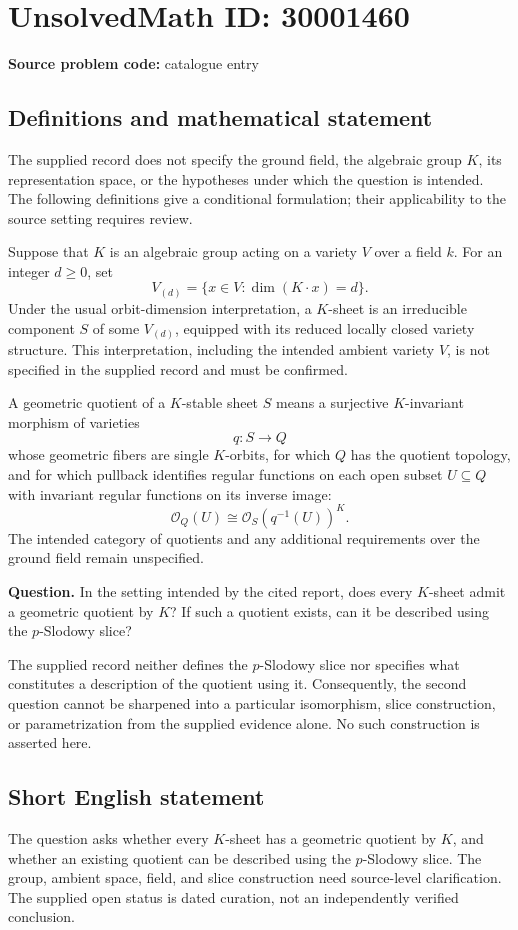 \documentclass[11pt]{article}
\begin{document}
\section*{UnsolvedMath ID: 30001460}
\textbf{Source problem code:} catalogue entry
\subsection{Definitions and mathematical statement}
The supplied record does not specify the ground field, the algebraic group \(K\), its representation space, or the hypotheses under which the question is intended. The following definitions give a conditional formulation; their applicability to the source setting requires review.

Suppose that \(K\) is an algebraic group acting on a variety \(V\) over a field \(k\). For an integer \(d\geq 0\), set
\[
V_{(d)}=\{x\in V:\dim(K\cdot x)=d\}.
\]
Under the usual orbit-dimension interpretation, a \(K\)-sheet is an irreducible component \(S\) of some \(V_{(d)}\), equipped with its reduced locally closed variety structure. This interpretation, including the intended ambient variety \(V\), is not specified in the supplied record and must be confirmed.

A geometric quotient of a \(K\)-stable sheet \(S\) means a surjective \(K\)-invariant morphism of varieties
\[
q:S\longrightarrow Q
\]
whose geometric fibers are single \(K\)-orbits, for which \(Q\) has the quotient topology, and for which pullback identifies regular functions on each open subset \(U\subseteq Q\) with invariant regular functions on its inverse image:
\[
\mathcal O_Q(U)\cong\mathcal O_S(q^{-1}(U))^K.
\]
The intended category of quotients and any additional requirements over the ground field remain unspecified.

\textbf{Question.} In the setting intended by the cited report, does every \(K\)-sheet admit a geometric quotient by \(K\)? If such a quotient exists, can it be described using the \(p\)-Slodowy slice?

The supplied record neither defines the \(p\)-Slodowy slice nor specifies what constitutes a description of the quotient using it. Consequently, the second question cannot be sharpened into a particular isomorphism, slice construction, or parametrization from the supplied evidence alone. No such construction is asserted here.
\subsection{Short English statement}
The question asks whether every \(K\)-sheet has a geometric quotient by \(K\), and whether an existing quotient can be described using the \(p\)-Slodowy slice. The group, ambient space, field, and slice construction need source-level clarification. The supplied open status is dated curation, not an independently verified conclusion.
\end{document}
